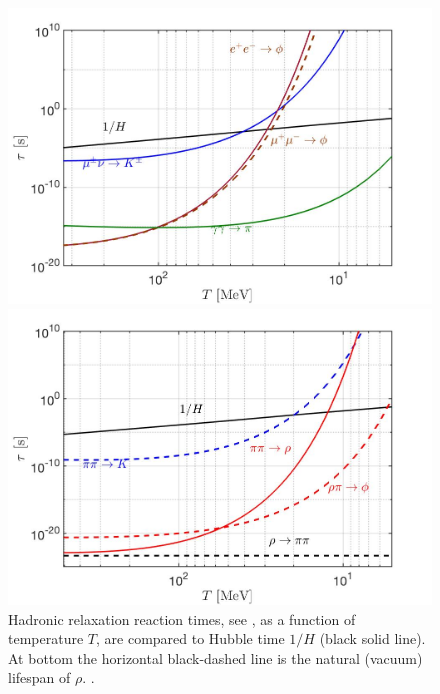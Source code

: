 \begin{figure}
\centerline{\includegraphics[width=0.9\linewidth]{./plots/Strangeness_Hubble002.jpg}}
\centerline{\includegraphics[width=0.9\linewidth]{./plots/Strangeness_Hubble003.jpg}}
\caption{Hadronic relaxation reaction times, see , as a function of temperature $T$, are compared to Hubble time $1/H$ (black solid line). At bottom the horizontal black-dashed line is the natural (vacuum) lifespan of $\rho$. . }
\label{reaction_time_tot} 
\end{figure}

